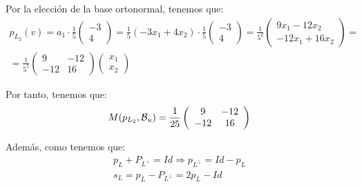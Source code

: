 \begin{ejercicio}
\begin{enumerate}
\begin{enumerate}
        Por la elección de la base ortonormal, tenemos que:
        \begin{multline*}
            p_{L_2}(v)=a_1\cdot \frac{1}{5}\left(\begin{array}{c}
                 -3 \\ 4
            \end{array}\right)
            =\frac{1}{5}(-3x_1+4x_2) \cdot \frac{1}{5}\left(\begin{array}{c}
                 -3 \\ 4
            \end{array}\right)
            =\frac{1}{5^2} \left(\begin{array}{c}
                 9x_1-12x_2 \\ -12x_1+16x_2
            \end{array}\right)
            =\\=
            \frac{1}{5^2}\left(\begin{array}{cc}
                9 & -12 \\
                -12 & 16
            \end{array}\right)\left(\begin{array}{c}
                 x_1 \\ x_2
            \end{array}\right)
        \end{multline*}

        Por tanto, tenemos que:
        \begin{equation*}
            M(p_{L_2},\mathcal{B}_u) = \frac{1}{25}\left(\begin{array}{cc}
                9 & -12 \\
                -12 & 16
            \end{array}\right)
        \end{equation*}

        Además, como tenemos que:
        \begin{gather*}
            p_L +P_{L^\perp} = Id \Longrightarrow p_{L^\perp} = Id -p_L\\
            s_L = p_L - P_{L^\perp} = 2p_L -Id
        \end{gather*}


\end{enumerate}
\end{enumerate}
\end{ejercicio}
